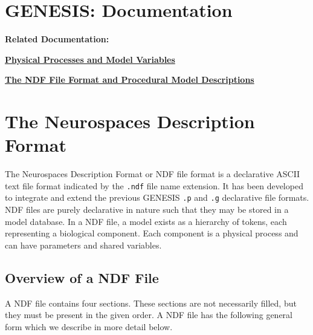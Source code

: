 \documentclass[12pt]{article}
\begin{document}
\section*{GENESIS: Documentation}

{\bf Related Documentation:}

\href{../model-variables/model-variables.tex}{\bf Physical Processes and Model Variables}

\href{../ndf-procedural-description/ndf-procedural-description.tex}{\bf The NDF File Format and Procedural Model Descriptions}


\section*{The Neurospaces Description Format}

The Neurospaces Description Format or NDF file format is a declarative ASCII text file format indicated by the {\tt .ndf} file name extension. It has been developed to integrate and extend the previous GENESIS {\tt .p} and {\tt .g} declarative file formats. NDF files are purely declarative in nature such that they may be stored in a model database. In a NDF file, a model exists as a hierarchy of tokens, each representing a biological component. Each component is a physical process and can have parameters and shared variables. 

\subsection*{Overview of a NDF File}
\label{sec:overview-ndf-file}
A NDF file contains four sections. These sections are not necessarily
filled, but they must be present in the given order.  A NDF file has
the following general form which we describe in more detail below.
\end{document}
